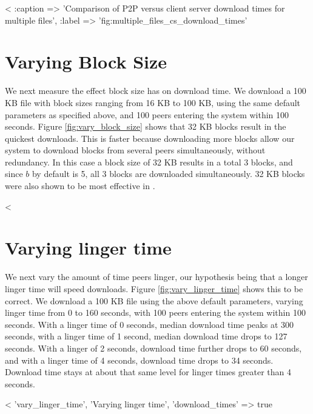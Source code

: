 <%
  :caption => 'Comparison of P2P versus client server download times for multiple files', :label => 'fig:multiple_files_cs_download_times' %

\section{Varying Block Size}

We next measure the effect block size has on download time. We download a 100 KB file with block sizes ranging from 
16 KB to 100 KB, using the same default parameters as specified above, and 100 peers entering the system within 100 seconds.  
Figure \ref{fig:vary_block_size} shows that 32 KB blocks result
in the quickest downloads.  This is faster because downloading more blocks allow our system to download 
blocks from several peers simultaneously, without redundancy.  In this case a block size of 32 KB results in a total 3 blocks, and since $b$ by default is 5, all 3 blocks
are downloaded simultaneously. 32 KB blocks were also shown to be most effective in \cite{zappala}.

<%

\section{Varying linger time}

We next vary the amount of time peers linger, our hypothesis being that a longer linger 
time will speed downloads.  Figure \ref{fig:vary_linger_time} shows this to be correct.
We download a 100 KB file using the above default parameters, varying linger time from 0 to 160 seconds, with 100 peers entering the system within 100 seconds.
With a linger time of 0 seconds, median download time peaks at 300 seconds, with 
a linger time of 1 second, median download time drops to 127 seconds.  With a linger of 2 seconds, download time further drops to 60 seconds, and
with a linger time of 4 seconds, download time drops to 34 seconds.  Download time stays at about that same level for linger times greater than 4 seconds.

<%
 'vary_linger_time', 'Varying linger time', 'download_times' => true  %


